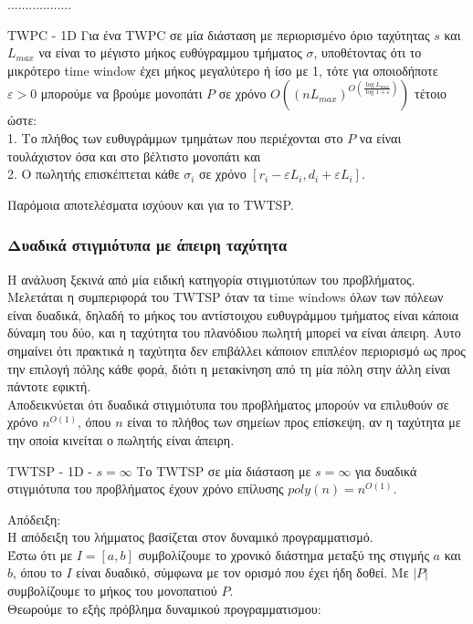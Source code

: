 \documentclass[oneside,12pt]{book}
\theoremstyle{definition}
\begin{document}
.................. \\

\begin{mytheorem}{TWPC - 1D}{}
	Για ένα TWPC σε μία διάσταση με περιορισμένο όριο ταχύτητας \(s\) και \(L_{max}\) να είναι το μέγιστο μήκος ευθύγραμμου τμήματος \(σ\), υποθέτοντας ότι το μικρότερο time window έχει μήκος μεγαλύτερο ή ίσο με 1, τότε για οποιοδήποτε \(ε > 0\) μπορούμε να βρούμε μονοπάτι \(P\) σε χρόνο \(Ο((nL_{max})^{O(\frac{\log L_{max}}{\log 1 + ε})})\) τέτοιο ώστε: \\
	1. Το πλήθος των ευθυγράμμων τμημάτων που περιέχονται στο \(P\) να είναι τουλάχιστον όσα και στο βέλτιστο μονοπάτι και \\
	2. Ο πωλητής επισκέπτεται κάθε \(σ_i\) σε χρόνο \([r_i - εL_i, d_i + εL_i]\). 
\end{mytheorem}

Παρόμοια αποτελέσματα ισχύουν και για το TWTSP. \\

\subsubsection{Δυαδικά στιγμιότυπα με άπειρη ταχύτητα}

Η ανάλυση ξεκινά από μία ειδική κατηγορία στιγμιοτύπων του προβλήματος. Μελετάται η συμπεριφορά του TWTSP όταν τα time windows όλων των πόλεων είναι δυαδικά, δηλαδή το μήκος του αντίστοιχου ευθυγράμμου τμήματος είναι κάποια δύναμη του δύο, και η ταχύτητα του πλανόδιου πωλητή μπορεί να είναι άπειρη. Αυτο σημαίνει ότι πρακτικά η ταχύτητα δεν επιβάλλει κάποιον επιπλέον περιορισμό ως προς την επιλογή πόλης κάθε φορά, διότι η μετακίνηση από τη μία πόλη στην άλλη είναι πάντοτε εφικτή. \\

Αποδεικνύεται ότι δυαδικά στιγμιότυπα του προβλήματος μπορούν να επιλυθούν σε χρόνο \(n^{Ο(1)}\), όπου \(n\) είναι το πλήθος των σημείων προς επίσκεψη, αν η ταχύτητα με την οποία κινείται ο πωλητής είναι άπειρη. \\

\begin{mylemma}{TWTSP - 1D - \(s = \infty\)}{}
	Το TWTSP σε μία διάσταση με \(s = \infty\) για δυαδικά στιγμιότυπα του προβλήματος έχουν χρόνο επίλυσης \(poly(n) = n^{O(1)}\).
\end{mylemma}

Απόδειξη: \\
Η απόδειξη του λήμματος βασίζεται στον δυναμικό προγραμματισμό. \\
Έστω ότι με \(I = [a,b]\) συμβολίζουμε το χρονικό διάστημα μεταξύ της στιγμής \(a\) και \(b\), όπου το \(I\) είναι δυαδικό, σύμφωνα με τον ορισμό που έχει ήδη δοθεί. Με \(|P|\) συμβολίζουμε το μήκος του μονοπατιού \(P\). \\
Θεωρούμε το εξής πρόβλημα δυναμικού προγραμματισμου:
\end{document}
